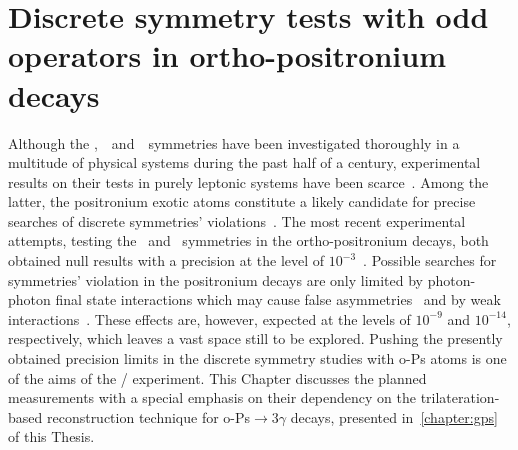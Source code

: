 \chapter[Discrete symmetry tests with odd operators in ortho-positronium decays]{Discrete symmetry tests with odd operators in ortho-positronium decays}\label{chapter:test_jpet}

Although the \Ts,~\CPs~and~\CPTs~symmetries have been investigated thoroughly in a multitude of physical systems during the past half of a century, experimental results on their tests in purely leptonic systems have been scarce~\cite{Arbic:1988pv,Skalsey:1991vt,cp_positronium,cpt_positronium}. Among the latter, the positronium exotic atoms constitute a likely candidate for precise searches of discrete symmetries' violations~\cite{Bernreuther:1988tt}. The most recent experimental attempts, testing the \CPs~and \CPTs~symmetries in the ortho-positronium decays, both obtained null results with a precision at the level of $10^{-3}$~\cite{cp_positronium,cpt_positronium}. Possible searches for symmetries' violation in the positronium decays are only limited by photon-photon final state interactions which may cause false asymmetries~\cite{Bernreuther:1988tt,Arbic:1988pv} and by weak interactions~\cite{sozzi}. These effects are, however, expected at the levels of $10^{-9}$ and $10^{-14}$, respectively, which leaves a vast space still to be explored. Pushing the presently obtained precision limits in the discrete symmetry studies with o-Ps atoms is one of the aims of the \jpet/ experiment. This Chapter discusses the planned measurements with a special emphasis on their dependency on the trilateration-based reconstruction technique for o-Ps$\to 3\gamma$ decays, presented in~\cref{chapter:gps} of this Thesis.

